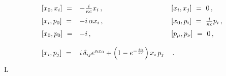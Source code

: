 \begin{equation}
\begin{array}{lll} [ x_0 , x_i ] \ = & -\frac{i}{\kappa c} x_i\, ,
\qquad\qquad & [ x_i , x_j ] \ = \ 0\, ,\medskip\cr [ x_i , p_0 ]
\ = & -i\,\alpha x_i\, , & [ x_0 , p_i ] \ = \ \frac{i}{\kappa c}
p_i\, ,\medskip\cr [ x_0 , p_0 ] \ = & - i\, , & [ p_\mu , p_\nu ]
\ = \ 0\, ,\bigskip\cr [ x_i , p_j ] \ = & i\,\delta_{i j}
e^{\alpha x_0} + \left(1 - e^{-\frac{i \alpha}{\kappa c}}\right)
x_i\,p_j& \, .\end{array}\label{r321}\end{equation}L
